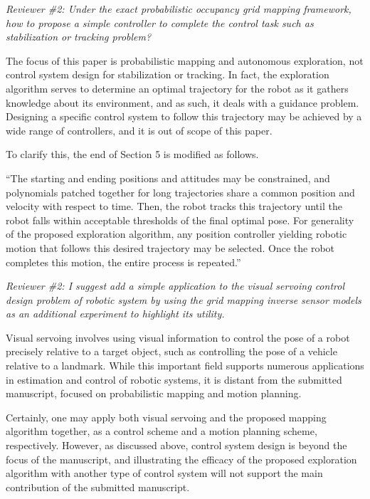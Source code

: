 \documentclass[11pt]{article}
\newenvironment{correction}{\begin{list}{}{\setlength{\leftmargin}{1cm}\setlength{\rightmargin}{1cm}}\vspace{\parsep}\item[]``}{''\end{list}}
\begin{document}
\begin{enumerate}\setlength{\itemsep}{2\parsep}

\item {\itshape Reviewer \#2: Under the exact probabilistic occupancy grid mapping framework, how to propose a simple controller to complete the control task such as stabilization or tracking problem?}

The focus of this paper is probabilistic mapping and autonomous exploration, not control system design for stabilization or tracking. In fact, the exploration algorithm serves to determine an optimal trajectory for the robot as it gathers knowledge about its environment, and as such, it deals with a guidance problem. Designing a specific control system to follow this trajectory may be achieved by a wide range of controllers, and it is out of scope of this paper. 

To clarify this, the end of Section 5 is modified as follows. 

\begin{correction}The starting and ending positions and attitudes may be constrained, and polynomials patched together for long trajectories share a common position and velocity with respect to time. Then, the robot tracks this trajectory until the robot falls within acceptable thresholds of the final optimal pose. For generality of the proposed exploration algorithm, any position controller yielding robotic motion that follows this desired trajectory may be selected. Once the robot completes this motion, the entire process is repeated.\end{correction}


\item {\itshape Reviewer \#2: I suggest add a simple application to the visual servoing control design problem of robotic system by using the grid mapping inverse sensor models as an additional experiment to highlight its utility.}

Visual servoing involves using visual information to control the pose of a robot precisely relative to a target object, such as controlling the pose of a vehicle relative to a landmark. While this important field supports numerous applications in estimation and control of robotic systems, it is distant from the submitted manuscript, focused on probabilistic mapping and motion planning. 

Certainly, one may apply both visual servoing and the proposed mapping algorithm together, as a control scheme and a motion planning scheme, respectively. However, as discussed above, control system design is beyond the focus of the manuscript, and illustrating the efficacy of the proposed exploration algorithm with another type of control system will not support the main contribution of the submitted manuscript. 


\end{enumerate}
\end{document}
